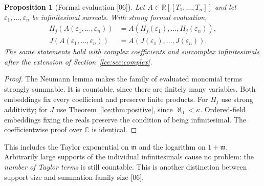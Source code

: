 \documentclass[11pt,letterpaper]{article}
\numberwithin{equation}{section}
\newtheorem{proposition}[theorem]{Proposition}
\theoremstyle{definition}
\theoremstyle{remark}
\newcommand{\R}{\mathbb R}
\newcommand{\C}{\mathbb C}
\newcommand{\eps}{\varepsilon}
\newcommand{\infideal}{\mathfrak m}
\newcommand{\thref}[1]{Theorem~\ref{#1}}
\newcommand{\src}[1]{\textup{\textsf{\small[#1]}}}%
\begin{document}
\begin{proposition}[Formal evaluation \src{06}]\label{lce:cs:prop:formal}
Let $A\in\R[[T_1,\ldots,T_n]]$ and let $\eps_1,\ldots,\eps_n$ be
infinitesimal surreals. With strong formal evaluation,
\begin{align*}
 H_j(A(\eps_1,\ldots,\eps_n))&=A(H_j(\eps_1),\ldots,H_j(\eps_n)),\\
 J(A(\eps_1,\ldots,\eps_n))&=A(J(\eps_1),\ldots,J(\eps_n)).
\end{align*}
The same statements hold with complex coefficients and surcomplex
infinitesimals after the extension of Section~\ref{lce:sec:complex}.
\end{proposition}
\begin{proof}
The Neumann lemma makes the family of evaluated monomial terms strongly
summable. It is countable, since there are finitely many variables. Both
embeddings fix every coefficient and preserve finite products. For $H_j$ use
strong additivity; for $J$ use \thref{lce:thm:positive}, since
$\aleph_0<\kappa$. Ordered-field embeddings fixing the reals preserve the
condition of being infinitesimal. The coefficientwise proof over $\C$ is
identical.
\end{proof}
This includes the Taylor exponential on $\infideal$ and the logarithm on
$1+\infideal$. Arbitrarily large supports of the individual infinitesimals
cause no problem: the \emph{number of Taylor terms} is still countable. This
is another distinction between support size and summation-family size
\src{06}.
\end{document}
